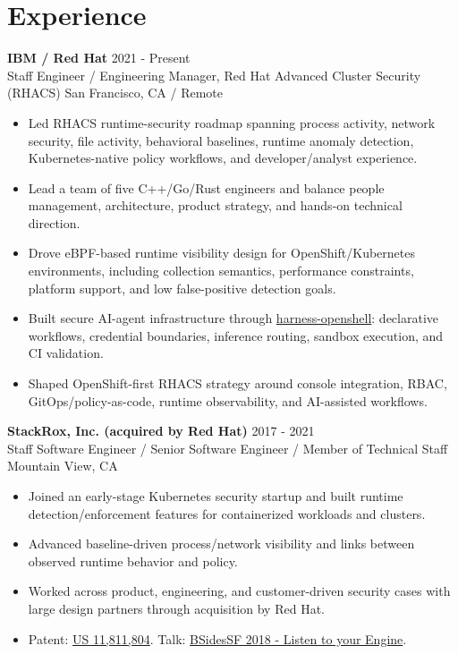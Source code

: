 \documentclass[9pt,letterpaper]{extarticle}
\newcommand{\role}[4]{%
  \textbf{#1} \hfill {\small #2}\\[-1pt]
  {\small #3} \hfill {\small #4}\vspace{1pt}
}
\newcommand{\link}[2]{\href{#1}{#2}}
\begin{document}
\section*{Experience}
\role{IBM / Red Hat}{2021 - Present}{Staff Engineer / Engineering Manager, Red Hat Advanced Cluster Security (RHACS)}{San Francisco, CA / Remote}
\begin{itemize}
  \item Led RHACS runtime-security roadmap spanning process activity, network security, file activity, behavioral baselines, runtime anomaly detection, Kubernetes-native policy workflows, and developer/analyst experience.
  \item Lead a team of five C++/Go/Rust engineers and balance people management, architecture, product strategy, and hands-on technical direction.
  \item Drove eBPF-based runtime visibility design for OpenShift/Kubernetes environments, including collection semantics, performance constraints, platform support, and low false-positive detection goals.
  \item Built secure AI-agent infrastructure through \link{https://github.com/stackrox/harness-openshell}{harness-openshell}: declarative workflows, credential boundaries, inference routing, sandbox execution, and CI validation.
  \item Shaped OpenShift-first RHACS strategy around console integration, RBAC, GitOps/policy-as-code, runtime observability, and AI-assisted workflows.
\end{itemize}

\role{StackRox, Inc. (acquired by Red Hat)}{2017 - 2021}{Staff Software Engineer / Senior Software Engineer / Member of Technical Staff}{Mountain View, CA}
\begin{itemize}
  \item Joined an early-stage Kubernetes security startup and built runtime detection/enforcement features for containerized workloads and clusters.
  \item Advanced baseline-driven process/network visibility and links between observed runtime behavior and policy.
  \item Worked across product, engineering, and customer-driven security cases with large design partners through acquisition by Red Hat.
  \item Patent: \link{https://patents.justia.com/patent/11811804}{US 11,811,804}. Talk: \link{https://www.youtube.com/watch?v=LFqWl7XB5Gc}{BSidesSF 2018 - Listen to your Engine}.
\end{itemize}
\end{document}
